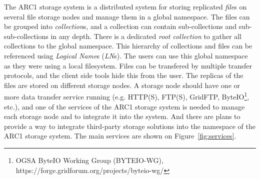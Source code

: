 \documentclass{book}
\begin{document}
The ARC1 storage system is a distributed system for storing replicated \emph{file}s on several file storage nodes and manage them in a global namespace. The files can be grouped into \emph{collection}s, and a collection can contain sub-collections and sub-sub-collections in any depth. There is a dedicated \emph{root collection} to gather all collections to the global namespace. This hierarchy of collections and files can be referenced using \emph{Logical Name}s (\emph{LN}s). The users can use this global namespace  as they were using a local filesystem. Files can be transfered by multiple transfer protocols, and the client side tools hide this from the user. The replicas of the files are stored on different storage nodes. A storage node should have one or more data transfer service running (e.g. HTTP(S), FTP(S), GridFTP, ByteIO\footnote{OGSA ByteIO Working Group (BYTEIO-WG), https://forge.gridforum.org/projects/byteio-wg/}, etc.), and one of the services of the ARC1 storage system is needed to manage each storage node and to integrate it into the system. And there are plans to provide a way to integrate third-party storage solutions into the namespace of the ARC1 storage system. The main services are shown on Figure~\ref{fig:services}.

\begin{figure}[ht]
\end{figure}
\end{document}
